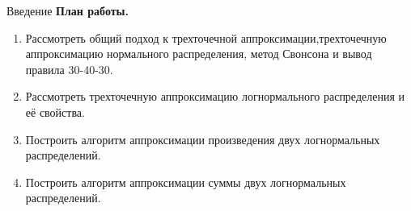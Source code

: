 \documentclass[ucs, notheorems, handout]{beamer}
\begin{document}
	
	\begin{frame}{Введение}
		\textbf{План работы.}
		\begin{enumerate}
			\medskip
			\item Рассмотреть общий подход к трехточечной аппроксимации,трехточечную аппроксимацию нормального распределения, метод Свонсона и вывод правила 30-40-30.
			\medskip
			\item Рассмотреть трехточечную аппроксимацию логнормального распределения и её  свойства.
			\medskip
			\item Построить алгоритм аппроксимации произведения двух логнормальных распределений.
			\medskip
			\item Построить алгоритм аппроксимации суммы двух логнормальных распределений.
		\end{enumerate}
	
	\end{frame}
	
\end{document}
